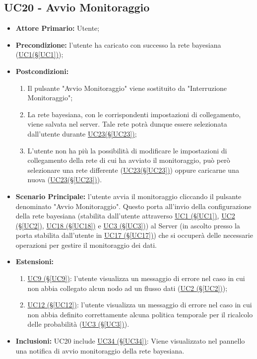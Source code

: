 \pagebreak

\subsection{UC20 - Avvio Monitoraggio}\label{UC20}

\begin{itemize}
	\item \textbf{Attore Primario:} Utente;
	\item \textbf{Precondizione:} l'utente ha caricato con successo la rete bayesiana (\hyperref[UC1]{UC1(§\ref*{UC1})});
	\item \textbf{Postcondizioni:}
	\begin{enumerate}
		\item Il pulsante "Avvio Monitoraggio" viene sostituito da "Interruzione Monitoraggio";
		\item La rete bayesiana, con le corrispondenti impostazioni di collegamento, viene salvata nel server. Tale rete potrà dunque essere selezionata dall'utente durante \hyperref[UC23]{UC23(§\ref*{UC23})};
		\item L'utente non ha più la possibilità di modificare le impostazioni di collegamento della rete di cui ha avviato il monitoraggio, può però selezionare una rete differente (\hyperref[UC23]{UC23(§\ref*{UC23})}) oppure caricarne una nuova (\hyperref[UC23]{UC23(§\ref*{UC23})}).
	\end{enumerate}
	\item \textbf{Scenario Principale:} l'utente avvia il monitoraggio cliccando il pulsante denominato "Avvio Monitoraggio". Questo porta all'invio della configurazione della rete bayesiana (stabilita dall'utente attraverso \hyperref[UC1]{UC1 (§\ref*{UC1})}, \hyperref[UC2]{UC2 (§\ref*{UC2})}, \hyperref[UC18]{UC18 (§\ref*{UC18})} e \hyperref[UC3]{UC3 (§\ref*{UC3})}) al Server (in ascolto presso la porta stabilita dall'utente in \hyperref[UC17]{UC17 (§\ref*{UC17})}) che si occuperà delle necessarie operazioni per gestire il monitoraggio dei dati.
	\item \textbf{Estensioni:}
	\begin{enumerate}
		\item \hyperref[UC9]{UC9 (§\ref*{UC9})}: l'utente visualizza un messaggio di errore nel caso in cui non abbia collegato alcun nodo ad un flusso dati (\hyperref[UC2]{UC2 (§\ref*{UC2})});
		\item \hyperref[UC12]{UC12 (§\ref*{UC12})}: l'utente visualizza un messaggio di errore nel caso in cui non abbia definito correttamente alcuna politica temporale per il ricalcolo delle probabilità (\hyperref[UC3]{UC3 (§\ref*{UC3})}).
	\end{enumerate}
	\item \textbf{Inclusioni:} UC20 include \hyperref[UC34]{UC34 (§\ref*{UC34})}: Viene visualizzato nel pannello una notifica di avvio monitoraggio della rete bayesiana.
\end{itemize}


